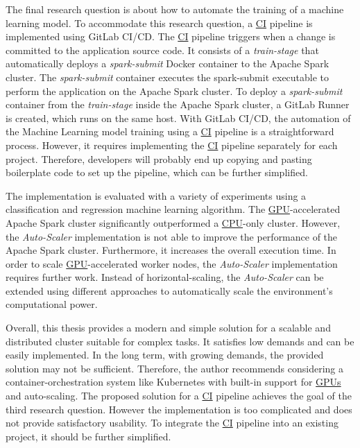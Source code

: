 The final research question is about how to automate the training of a machine learning model.
%
To accommodate this research question, a \hyperlink{abbr:ci}{CI} pipeline is implemented using GitLab CI/CD. The \hyperlink{abbr:ci}{CI} pipeline triggers when a change is committed to the application source code.
It consists of a \textit{train-stage} that automatically deploys a \textit{spark-submit} Docker container to the Apache Spark cluster.
The \textit{spark-submit} container executes the spark-submit executable to perform the application on the Apache Spark cluster.
To deploy a \textit{spark-submit} container from the \textit{train-stage} inside the Apache Spark cluster, a GitLab Runner is created, which runs on the same host.
With GitLab CI/CD, the automation of the Machine Learning model training using a \hyperlink{abbr:ci}{CI} pipeline is a straightforward process. However, it requires implementing the \hyperlink{abbr:ci}{CI} pipeline separately for each project. Therefore, developers will probably end up copying and pasting boilerplate code to set up the pipeline, which can be further simplified.


The implementation is evaluated with a variety of experiments using a classification and regression machine learning algorithm.
The \hyperlink{abbr:gpu}{GPU}-accelerated Apache Spark cluster significantly outperformed a \hyperlink{abbr:cpu}{CPU}-only cluster.
However, the \textit{Auto-Scaler} implementation is not able to improve the performance of the Apache Spark cluster. Furthermore, it increases the overall execution time. In order to scale \hyperlink{abbr:gpu}{GPU}-accelerated worker nodes, the \textit{Auto-Scaler} implementation requires further work. Instead of horizontal-scaling, the \textit{Auto-Scaler} can be extended using different approaches to automatically scale the environment's computational power.


Overall, this thesis provides a modern and simple solution for a scalable and distributed cluster suitable for complex tasks. It satisfies low demands and can be easily implemented. In the long term, with growing demands, the provided solution may not be sufficient. Therefore, the author recommends considering a container-orchestration system like Kubernetes with built-in support for \hyperlink{abbr:gpu}{GPUs} and auto-scaling. The proposed solution for a \hyperlink{abbr:ci}{CI} pipeline achieves the goal of the third research question. However the implementation is too complicated and does not provide satisfactory usability. To integrate the \hyperlink{abbr:ci}{CI} pipeline into an existing project, it should be further simplified.


